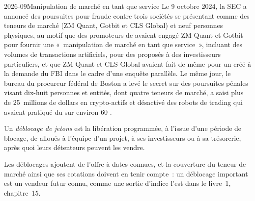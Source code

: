 \begin{dated}{2026-09}{Manipulation de marché en tant que service}\label{dat:m3:the-crypto-trading-business:mirrors}
Le 9 octobre 2024, la SEC a annoncé des poursuites pour fraude contre trois sociétés se présentant comme des teneurs de marché (ZM Quant, Gotbit et CLS Global) et neuf
personnes physiques, au motif que des promoteurs de  avaient engagé ZM Quant et Gotbit pour fournir une «~manipulation de marché en tant que service~», incluant des volumes de transactions artificiels,
pour des  proposés à des investisseurs particuliers, et que ZM Quant et CLS Global avaient fait de même pour un  créé à la demande du FBI dans le cadre
d'une enquête parallèle. Le même jour, le bureau du procureur fédéral de Boston a levé le secret sur des poursuites pénales visant dix-huit personnes et entités,
dont quatre teneurs de marché, a saisi plus de 25~millions de dollars en crypto-actifs et désactivé des robots de trading qui avaient pratiqué du  sur environ 60 .
\end{dated}

\begin{definition}\label{def:m3:the-crypto-trading-business:unlock}
Un \emph{déblocage de jetons} est la libération programmée, à l'issue d'une période de blocage, de  alloués à l'équipe d'un projet, à ses investisseurs ou à sa trésorerie, après
quoi leurs détenteurs peuvent les vendre.
\end{definition}

Les déblocages ajoutent de l'offre à dates connues, et la couverture du teneur de marché ainsi que ses cotations doivent en tenir compte~: un déblocage important est un vendeur futur connu,
comme une sortie d'indice l'est dans le livre~1, chapitre~15.

